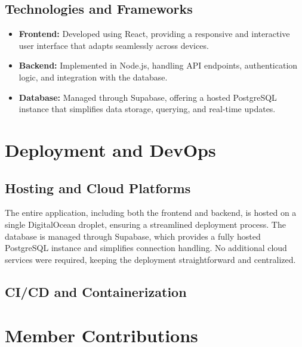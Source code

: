 \documentclass[12pt, a4paper]{report}
\begin{document}
\subsection{Technologies and Frameworks}
\begin{itemize}
    \item \textbf{Frontend:} Developed using React, providing a responsive and interactive user interface that adapts seamlessly across devices.
    \item \textbf{Backend:} Implemented in Node.js, handling API endpoints, authentication logic, and integration with the database.
    \item \textbf{Database:} Managed through Supabase, offering a hosted PostgreSQL instance that simplifies data storage, querying, and real-time updates.
\end{itemize}

\section{Deployment and DevOps}
\subsection{Hosting and Cloud Platforms}

The entire application, including both the frontend and backend, is hosted on a single DigitalOcean droplet, ensuring a streamlined deployment process.
The database is managed through Supabase, which provides a fully hosted PostgreSQL instance and simplifies connection handling. 
No additional cloud services were required, keeping the deployment straightforward and centralized.

\subsection{CI/CD and Containerization}

\section{Member Contributions}

\end{document}

